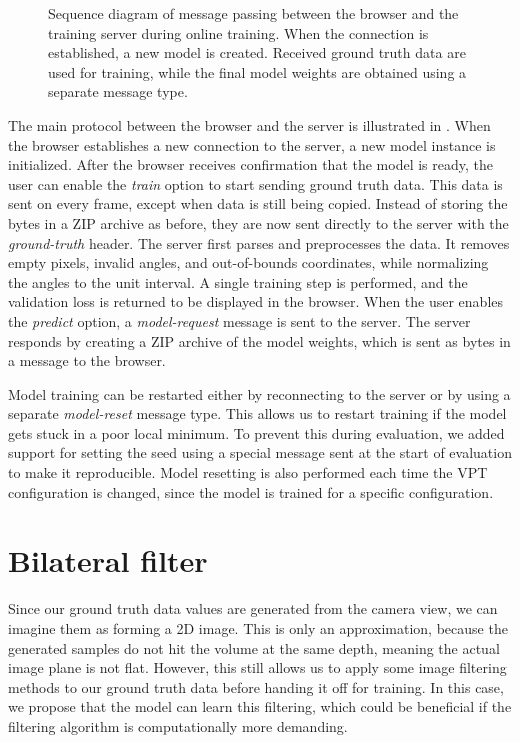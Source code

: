 \begin{figure}[!b]
    \centering
    
    \caption{
        Sequence diagram of message passing between the browser and the
        training server during online training. When the connection is
        established, a new model is created. Received ground truth data are
        used for training, while the final model weights are obtained using a
        separate message type.
    }
    \label{fig:server}
\end{figure}

The main protocol between the browser and the server is illustrated in
. When the browser establishes a new connection to the server,
a new model instance is initialized. After the browser receives confirmation
that the model is ready, the user can enable the \emph{train} option to start 
sending ground truth data. This data is sent on every frame, except when data is
still being copied. Instead of storing the bytes in a ZIP archive as before, they 
are now sent directly to the server with the \emph{ground-truth} header. The
server first parses and preprocesses the data. It removes empty pixels, invalid 
angles, and out-of-bounds coordinates, while normalizing the angles to the unit
interval. A single training step is performed, and the validation loss is returned 
to be displayed in the browser. When the user enables the \emph{predict} option,
a \emph{model-request} message is sent to the server. The server responds by 
creating a ZIP archive of the model weights, which is sent as bytes in a message
to the browser.

Model training can be restarted either by reconnecting to the server or by using
a separate \emph{model-reset} message type. This allows us to restart training if
the model gets stuck in a poor local minimum. To prevent this during evaluation,
we added support for setting the seed using a special message sent at the start
of evaluation to make it reproducible. Model resetting is also performed each
time the VPT configuration is changed, since the model is trained for a specific
configuration.

\section{Bilateral filter}

Since our ground truth data values are generated from the camera view, we can
imagine them as forming a 2D image. This is only an approximation, because the
generated samples do not hit the volume at the same depth, meaning the actual
image plane is not flat. However, this still allows us to apply some image
filtering methods to our ground truth data before handing it off for training.
In this case, we propose that the model can learn this filtering, which could be
beneficial if the filtering algorithm is computationally more demanding.

